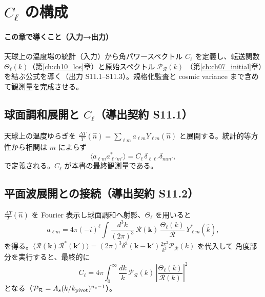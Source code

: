 \section{$C_\ell$ の構成}
\label{ch:ch11_cl}

\paragraph{この章で導くこと（入力→出力）}
天球上の温度場の統計（入力）から角パワースペクトル $C_\ell$ を定義し、転送関数
$\Theta_\ell(k)$（第\ref{ch:ch10_los}章）と原始スペクトル $\mathcal P_\mathcal R(k)$
（第\ref{ch:ch07_initial}章）を結ぶ公式を導く（出力 S11.1--S11.3）。規格化監査と
cosmic variance まで含めて観測量を完成させる。

\subsection{球面調和展開と $C_\ell$（導出契約 S11.1）}
天球上の温度ゆらぎを $\frac{\Delta T}{T}(\hat n)=\sum_{\ell m}a_{\ell m}Y_{\ell m}(\hat n)$
と展開する。統計的等方性から相関は $m$ によらず
\begin{equation}
  \langle a_{\ell m}a^*_{\ell'm'}\rangle=C_\ell\,\delta_{\ell\ell'}\delta_{mm'},
\end{equation}
で定義される。$C_\ell$ が本書の最終観測量である。

\subsection{平面波展開との接続（導出契約 S11.2）}
$\frac{\Delta T}{T}(\hat n)$ を Fourier 表示し球面調和へ射影、$\Theta_\ell$ を用いると
\begin{equation}
  a_{\ell m}=4\pi(-i)^\ell\int\frac{d^3k}{(2\pi)^3}\,\mathcal R(\mathbf k)\,
  \frac{\Theta_\ell(k)}{\mathcal R}\,Y^*_{\ell m}(\hat k),
\end{equation}
を得る。$\langle\mathcal R(\mathbf k)\mathcal R^*(\mathbf k')\rangle=(2\pi)^3
\delta^3(\mathbf k-\mathbf k')\frac{2\pi^2}{k^3}\mathcal P_\mathcal R(k)$ を代入して
角度部分を実行すると、最終的に
\begin{equation}
  \boxed{\ C_\ell=4\pi\int_0^\infty\frac{dk}{k}\,\mathcal P_\mathcal R(k)\,
  \left|\frac{\Theta_\ell(k)}{\mathcal R(k)}\right|^2\ }
  \label{eq:cl}
\end{equation}
となる（$\mathcal P_\mathcal R=A_s(k/k_{\rm pivot})^{n_s-1}$）。

